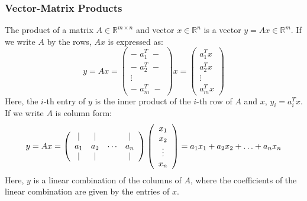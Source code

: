 \documentclass[twoside,twocolumn]{article}
\begin{document}
\subsubsection{Vector-Matrix Products}
The product of a matrix $A \in \mathbb{R}^{m \times n}$ and vector
$x \in \mathbb{R}^n$ is a vector $y = Ax \in \mathbb{R}^m$. If we write $A$
by the rows, $Ax$ is expressed as:
\begin{equation}
  y = A x = \left( \begin{array} { c } { - \,\, a _ { 1 } ^ { T } \,\,- } \\ { - \,\,a _ { 2 } ^ { T }\,\, -} \\ { \vdots } \\ { - \,\, a _ { m } ^ { T } \,\,-} \end{array} \right) x = \left( \begin{array} { c } { a _ { 1 } ^ { T } x } \\ { a _ { 2 } ^ { T } x } \\ { \vdots } \\ { a _ { m } ^ { T } x } \end{array} \right)
\end{equation}
Here, the $i$-th entry of $y$ is the inner product of the $i$-th row of $A$ and
$x$, $y_i = a_i^T x$. If we write $A$ is column form:
\begin{equation}
  y = A x = \left( \begin{array} { c c c c } { | } & { | } & { } & { | } \\ { a _ { 1 } } & { a _ { 2 } } & { \cdots } & { a _ { n } } \\ { | } & { | } & { } & { | } \end{array} \right) \left( \begin{array} { c } { x _ { 1 } } \\ { x _ { 2 } } \\ { \vdots } \\ { x _ { n } } \end{array} \right) = a _ { 1 } x _ { 1 } + a _ { 2 } x _ { 2 } + \ldots +  a _ { n } x _ { n }
\end{equation}
Here, $y$ is a linear combination of the columns of $A$, where the coefficients
of the linear combination are given by the entries of $x$.
\end{document}
